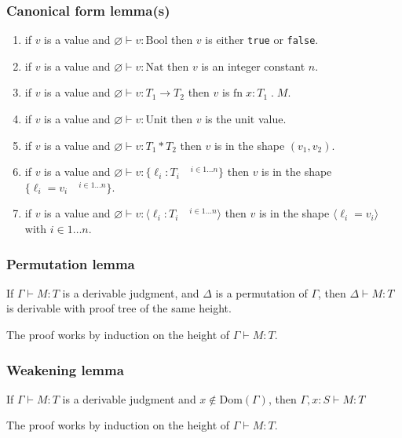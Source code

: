 \documentclass[11pt]{article}
\newcommand{\fn}[2]{\ensuremath{\text{fn}\; #1 \; . \; #2}}
\newcommand{\Bool}{\ensuremath{\mbox{Bool}}}
\newcommand{\Nat}{\ensuremath{\mbox{Nat}}}
\newcommand{\unit}{\ensuremath{\mbox{unit}}}
\newcommand{\Unit}{\ensuremath{\mbox{Unit}}}
\newcommand{\type}[2]{\ensuremath{ #1 : #2 }}
\newcommand{\Dom}{\ensuremath{\mbox{Dom}}}
\newcommand{\pair}[2]{\ensuremath{( #1 , #2 )}}
\newcommand{\rec}[1]{\ensuremath{ \{ #1 \} }}
\newcommand{\var}[1]{\ensuremath{ \langle #1 \rangle }}
\let\emptyset\varnothing
\begin{document}
\subsubsection*{Canonical form lemma(s)}
\label{sec:org4b40b87}
\begin{enumerate}
\item if \(v\) is a value and \(\emptyset \vdash \type{v}{\Bool}\)
then \(v\) is either \texttt{true} or \texttt{false}.
\item if \(v\) is a value and \(\emptyset \vdash \type{v}{\Nat}\)
then \(v\) is an integer constant \(n\).
\item if \(v\) is a value and \(\emptyset \vdash \type{v}{T_1 \to
       T_2}\) then \(v\) is \(\fn{\type{x}{T_1}}{M}\).
\item if \(v\) is a value and \(\emptyset \vdash \type{v}{\Unit}\) then
\(v\) is the \(\unit\) value.
\item if \(v\) is a value and \(\emptyset \vdash \type{v}{T_1 * T_2}\)
then \(v\) is in the shape \(\pair{v_1}{v_2}\).
\item if \(v\) is a value and \(\emptyset \vdash
       \type{v}{\rec{\type{\ell_i}{T_i}\quad^{i\in 1 \dots n}}}\) then
\(v\) is in the shape \(\rec{\ell_i = v_i\quad^{i\in 1 \dots
       n}}\).
\item if \(v\) is a value and \(\emptyset \vdash
       \type{v}{\var{\type{\ell_i}{T_i}\quad^{i\in 1 \dots n}}}\) then
\(v\) is in the shape \(\var{\ell_i = v_i}\) with \(i\in 1\dots
       n\).
\end{enumerate}

\subsubsection*{Permutation lemma}
\label{sec:org63792d8}
If \(\Gamma\vdash\type{M}{T}\) is a derivable judgment, and
\(\Delta\) is a permutation of \(\Gamma\), then
\(\Delta\vdash\type{M}{T}\) is derivable with proof tree of the
same height.

The proof works by induction on the height of \(\Gamma\vdash
    \type{M}{T}\).

\subsubsection*{Weakening lemma}
\label{sec:org4aeecbd}
If \(\Gamma\vdash\type{M}{T}\) is a derivable judgment and \(x
    \not\in \Dom (\Gamma)\), then
\(\Gamma,\type{x}{S}\vdash\type{M}{T}\)

The proof works by induction on the height of \(\Gamma\vdash
    \type{M}{T}\).
\end{document}
